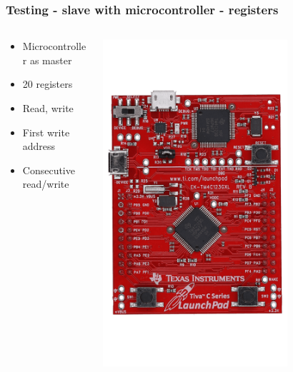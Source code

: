 \documentclass{beamer}
\begin{document}
\begin{frame}
  \frametitle{Testing - slave with microcontroller - registers}

  \begin{columns}
    \begin{column}{0.5\textwidth}
      \begin{itemize}
        \item Microcontroller as master
        \item 20 registers
        \item Read, write
        \item First write address
        \item Consecutive read/write
      \end{itemize}
    \end{column}

    \begin{column}{0.5\textwidth}
      \includegraphics[width=0.7\textwidth]{img/tiva-c-kit.png}
    \end{column}
  \end{columns}
\end{frame}
\end{document}
